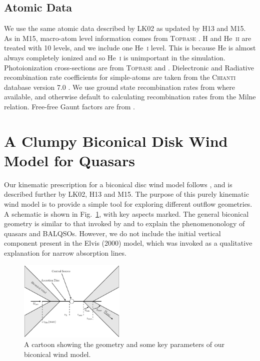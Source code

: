 \documentclass[useAMS,usenatbib]{mn2e_x}
\begin{document}
\subsection{Atomic Data}
We use the same atomic data  described by LK02 as updated by H13 and M15.
As in M15, macro-atom level information comes from \textsc{Topbase} \citep{cunto1993}.
H and He~\textsc{ii} are treated with 10 levels, and we include one He~\textsc{i} 
level. This is because He is almost always completely ionized 
and so He~\textsc{i} is unimportant in the simulation.
Photoionization cross-sections are from \textsc{Topbase} \citep{cunto1993} and \cite{vfky}.
Dielectronic and Radiative recombination rate coefficients for simple-atoms are taken from 
the \textsc{Chianti} database version 7.0 \citep{dere1997,landi2012}.
We use ground state recombination rates from \cite{badnell2006} where available,
and otherwise default to calculating recombination rates from the Milne
relation. Free-free Gaunt factors are from \cite{sutherland1998}.


%
%

\section{A Clumpy Biconical Disk Wind Model for Quasars}

Our kinematic prescription for a biconical disc wind model
follows \cite{SV93}, and is described further by
LK02, H13 and M15. The purpose of this
purely kinematic wind model is to provide a simple tool for 
exploring different outflow geometries.
A schematic is shown in Fig.~\ref{fig:cartoon},
with key aspects marked. The general biconical
geometry is similar to that invoked by \cite{MCGV95} and 
\cite{elvis2000} to explain the phenomenonology
of quasars and BALQSOs. However, we do not include the initial
vertical component present in the Elvis (2000) model, which was
invoked as a qualitative explanation for narrow absorption lines.

\begin{figure} 
\centering
\includegraphics[width=0.45\textwidth]{figures/fig1.eps}
\caption
{
A cartoon showing the geometry and some key parameters of
our biconical wind model.
}
\label{fig:cartoon}
\end{figure} 
\end{document}
